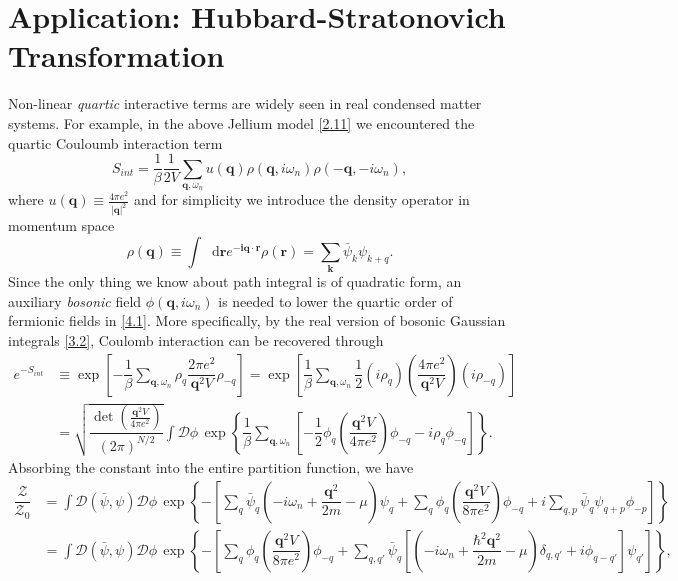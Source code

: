 \documentclass[10pt,nofootinbib]{revtex4}
\newcommand*\dd{\mathop{}\!\mathrm{d}}
\begin{document}
\section{Application: Hubbard-Stratonovich Transformation}
	Non-linear \emph{quartic} interactive terms are widely seen in real condensed matter systems. For example, in the above Jellium model \eqref{2.11} we encountered the quartic Couloumb interaction term
	\begin{equation}\label{4.1}
		S_{int}=\dfrac{1}{\beta}\dfrac{1}{2V}\sum_{\bm{q},\omega_n}u(\bm{q})\rho(\bm{q},i\omega_n)\rho(\bm{-q},-i\omega_n),
	\end{equation} 
	where $u(\bm{q})\equiv\frac{4\pi e^2}{|\bm{q}|^2}$ and for simplicity we introduce the density operator in momentum space
	\begin{equation*}
		\rho(\bm{q})\equiv\int\dd\bm{r}e^{-\bm{iq\cdot r}}\rho(\bm{r})=\sum_{\bm{k}}\bar\psi_{k}\psi_{k+q}.
	\end{equation*}
	Since the only thing we know about path integral is of {\color{red}quadratic} form, an auxiliary \emph{bosonic} field $\phi(\bm{q},i\omega_n)$ is needed to lower the {\color{red}quartic} order of fermionic fields in \eqref{4.1}. More specifically, by the real version of bosonic Gaussian integrals \eqref{3.2}, Coulomb interaction can be recovered through
	\begin{align*}
		e^{-S_{int}}&\equiv\exp \left[-\dfrac{1}{\beta}\sum_{\bm{q},\omega_n}\rho_{q}\dfrac{2\pi e^2}{\bm{q}^2 V}\rho_{-q}\right]=\exp \left[\dfrac{1}{\beta}\sum_{\bm{q},\omega_n}\dfrac{1}{2}(i\rho_{q})\left(\dfrac{4\pi e^2}{\bm{q}^2 V}\right)(i\rho_{-q})\right] \\
		&=\sqrt{\dfrac{\det \left(\frac{\bm{q}^2 V}{4\pi e^2}\right) }{(2\pi)^{N/2}}}\int\mathcal{D}\phi\,\exp\left\{\dfrac{1}{\beta}\sum_{\bm{q},\omega_n}\left[-\dfrac{1}{2}\phi_q\left(\dfrac{\bm{q}^2 V}{4\pi e^2}\right)\phi_{-q}-i\rho_q\phi_{-q}\right]\right\}.
	\end{align*}
	Absorbing the constant into the entire partition function, we have
	\begin{align}
		\dfrac{\mathcal{Z}}{\mathcal{Z}_0}&=\int\mathcal{D}(\bar\psi,\psi)\mathcal{D}\phi\,\exp \left\{-\left[\sum_{q}\bar\psi_q \left(-i\omega_n+\dfrac{\bm{q}^2}{2m}-\mu\right)\psi_q+\sum_{q}\phi_q\left(\dfrac{\bm{q}^2V}{8\pi e^2}\right)\phi_{-q}+i\sum_{q,p}\bar\psi_q\psi_{q+p}\phi_{-p}\right]\right\}\nonumber\\
		&=\int\mathcal{D}(\bar\psi,\psi)\mathcal{D}\phi\,\exp  \left\{-\left[\sum_{q}\phi_q\left(\dfrac{\bm{q}^2V}{8\pi e^2}\right)\phi_{-q}+\sum_{q,q'}\bar\psi_q\left[\left(-i\omega_n+\dfrac{\hbar^2\bm{q}^2}{2m}-\mu\right)\delta_{q,q'}+i\phi_{q-q'}\right]\psi_{q'}\right]\right\},\label{4.4}
	\end{align}
\end{document}
